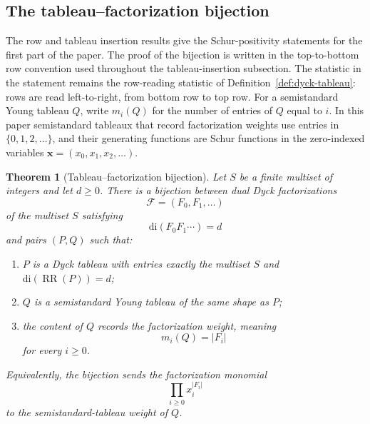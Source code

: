 \documentclass[11pt]{article}
\theoremstyle{plain}
\newtheorem{theorem}{Theorem}[section]
\theoremstyle{definition}
\theoremstyle{remark}
\newcommand{\di}{\mathrm{di}}
\begin{document}
\subsection{The tableau--factorization bijection}
The row and tableau insertion results give the Schur-positivity statements
for the first part of the paper.  The proof of the bijection is written in the
top-to-bottom row convention used throughout the tableau-insertion subsection.
The statistic in the statement remains the row-reading statistic of
Definition~\ref{def:dyck-tableau}: rows are read left-to-right, from bottom row
to top row.
For a semistandard Young tableau \(Q\), write \(m_i(Q)\) for the number of
entries of \(Q\) equal to \(i\).  In this paper semistandard tableaux that
record factorization weights use entries in \(\{0,1,2,\ldots\}\), and their
generating functions are Schur functions in the zero-indexed variables
\(\mathbf{x}=(x_0,x_1,x_2,\ldots)\).
\begin{theorem}[Tableau--factorization bijection]
\label{thm:tableau-factorization-bijection}
Let \(S\) be a finite multiset of integers and let \(d\ge 0\).  There is a
bijection between dual Dyck factorizations
\[
  \mathcal F=(F_0,F_1,\ldots)
\]
of the multiset \(S\) satisfying
\[
  \di(F_0F_1\cdots)=d
\]
and pairs \((P,Q)\) such that:
\begin{enumerate}[label=(\roman*)]
\item \(P\) is a Dyck tableau with entries exactly the multiset \(S\) and
      \(\di(\operatorname{RR}(P))=d\);
\item \(Q\) is a semistandard Young tableau of the same shape as \(P\);
\item the content of \(Q\) records the factorization weight, meaning
      \[
        m_i(Q)=|F_i|
      \]
      for every \(i\ge 0\).
\end{enumerate}
Equivalently, the bijection sends the factorization monomial
\[
  \prod_{i\ge 0}x_i^{|F_i|}
\]
to the semistandard-tableau weight of \(Q\).
\end{theorem}
\end{document}
